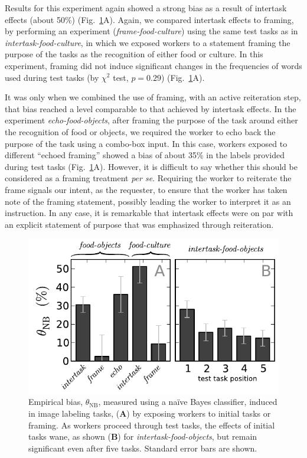 \documentclass[12pt]{article}
\begin{document}
Results for this experiment again showed a 
strong bias as a result of intertask effects (about 50\%) 
(Fig.~\ref{fig:theta}A).  Again, we compared intertask effects to 
framing, by performing an experiment (\textit{frame-food-culture}) using 
the same test tasks as in \textit{intertask-food-culture}, in which we exposed
workers to a statement framing the purpose of the tasks as the recognition 
of either food or culture.  
In this experiment, framing did not induce significant changes in the 
frequencies of words used during test tasks (by $\chi^2$ test, $p=0.29$) 
(Fig.~\ref{fig:theta}A).

It was only when we combined the use of framing, with an active 
reiteration step, that bias reached a level comparable to that achieved 
by intertask effects.  In the experiment \textit{echo-food-objects},
after framing the purpose of the task around either the recognition of food
or objects, we required the worker to echo back the purpose of the task
using a combo-box input.  In this case, workers exposed to different 
``echoed framing'' showed a bias of about 35\% in the labels provided during 
test tasks
(Fig.~\ref{fig:theta}A). However, it is difficult to say whether this 
should be considered as a framing treatment \textit{per se}.
Requiring the worker to reiterate the frame signals our intent, as the 
requester, to ensure that the worker has taken note of the framing statement, 
possibly leading the worker to interpret it as an instruction.  
In any case, it is remarkable that intertask effects
were on par with an explicit statement of purpose that was emphasized 
through reiteration.

\begin{figure}
	\centering
	\includegraphics[scale=1]{figs/theta.pdf}
	\caption{
		Empirical bias, $\theta_\mathrm{NB}$, measured using a na\"ive Bayes 
		classifier, induced in image labeling tasks,
		(\textbf{A}) by exposing workers to initial tasks or framing. 
		As workers proceed through test tasks, the effects of initial tasks 
		wane, as shown (\textbf{B}) for \textit{intertask-food-objects}, but 
		remain significant even after five tasks.  Standard error bars are 
		shown.
	}
	\label{fig:theta}
\end{figure}
\end{document}
